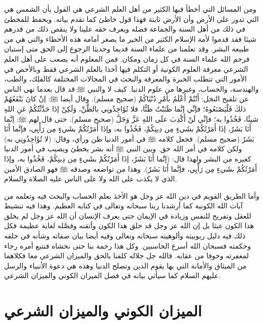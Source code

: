 ومن المسائل التي أخطأ فيها الكثير من أهل العلم الشرعي هي القول بأن الشمس هي التي تدور على الأرض وأن الأرض ثابتة فهذا قول خاطئ كما تقدم بيانه. ويحفظ للمخطئ في ذلك من أهل السنة والجماعة فضله ويعرف حقه علينا ولا ينقص ذلك من قدرهم شيئا فقد قدموا لأمة الإسلام الكثير من الخير ما يصغر أمامه هذه الأخطاء والتي هي من طبيعة البشر. وقد تعلمنا من علماء السنة قديما وحديثا الرجوع إلى الحق متى إستبان فرحم الله علماء السنة في كل زمان ومكان. فمن المعلوم أنه يصعب على أهل العلم الشرعي معرفة العلوم الكونية أو التكلم فيها أخذا بالعلم الشرعي فقط وبالأخص في الأمور التي تتطلب الخبرة والمعرفة والبحث في المجالات المختلفة كالفلك، والطب، والهندسة، والحساب، وغيرها من علوم الدنيا. كيف لا والنبي ﷺ قد قال بعدما نهى الناس عن تلقيح النخل: أَنْتُمْ أَعْلَمُ بأَمْرِ دُنْيَاكُمْ {\footnotesize (صحيح مسلم)}. وقال أيضا ﷺ: إنْ كانَ يَنْفَعُهُمْ ذلكَ فَلْيَصْنَعُوهُ؛ فإنِّي إنَّما ظَنَنْتُ ظَنًّا، فلا تُؤَاخِذُونِي بالظَّنِّ، وَلَكِنْ إذَا حَدَّثْتُكُمْ عَنِ اللهِ شيئًا، فَخُذُوا به؛ فإنِّي لَنْ أَكْذِبَ علَى اللهِ عَزَّ وَجَلَّ {\footnotesize (صحيح مسلم)}. حتى قال لهم ﷺ: إنَّما أَنَا بَشَرٌ، إذَا أَمَرْتُكُمْ بشَيءٍ مِن دِينِكُمْ، فَخُذُوا به، وإذَا أَمَرْتُكُمْ بشَيءٍ مِن رَأْيِي، فإنَّما أَنَا بَشَرٌ {\footnotesize (صحيح مسلم)}. فجعل كلامه ﷺ في أمور الدنيا ظن ورأي، وقال: (لا تُؤَاخِذُونِي به) ولكن كلامه في أمر الله حق. وبين النبي ﷺ أنه بشر يخطئ ويصيب في أمور الدنيا كغيره من البشر ولهذا قال:  (إنَّما أَنَا بَشَرٌ، إذَا أَمَرْتُكُمْ بشَيءٍ مِن دِينِكُمْ، فَخُذُوا به، وإذَا أَمَرْتُكُمْ بشَيءٍ مِن رَأْيِي، فإنَّما أَنَا بَشَرٌ). وهذا من تواضعه وصدقه ﷺ فهو الصادق الأمين الذي لا يكذب على الله ولا على الناس عليه الصلاة والسلام.

وأما الطريق القويم في دين الله عز وجل هو الأخذ بعلم الحساب والبحث فيه وتعلمه من آيات الله الكونية كما أرشدنا ربنا سبحانه وتعالى في كتابه العظيم. وهذا فيه تنشيط للعقل وتفريح للنفس وزيادة في الإيمان حتى يعرف الإنسان أن الله عز وجل لم يخلق هذا الكون عبثا بل إن الله عز وجل قد خلق هذا الكون وأتقنه وفصَّله لغاية عظيمة فكل ذلك فيه دليل ربوبيته وألوهيته سبحانه وتعالى وفيه أيضا بيان صفاته وشأنه في خلقه وحكمته فسبحان الله أسرع الحاسبين. وكل هذا رحمة بنا حتى نخشاه فنتبع أمره رجاء لمغفرته وخوفا من عقابه. فالله جل جلاله كلفنا بالحق والميزان الشرعي معا فكلاهما من الميثاق والأمانة التي بها يقوم الدين وتصلح الدنيا وهذه هي دعوة الأنبياء والرسل عليهم السلام كما سيأتي بيانه في فصل الميزان الكوني والميزان الشرعي.

\chapter{الميزان الكوني والميزان الشرعي}

